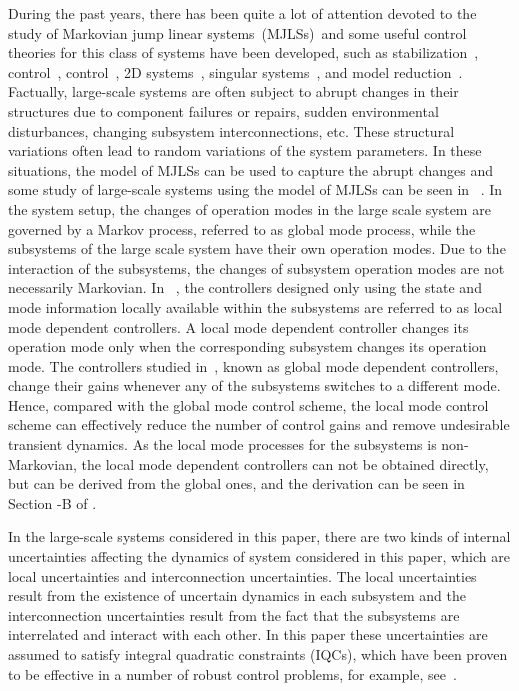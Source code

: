 \documentclass[11pt,draftcls,onecolumn]{IEEEtran}
\begin{document}
 During the past years, there has been quite a lot of attention devoted to the study of  Markovian jump linear systems~(MJLSs)~and some useful control theories for this class of systems have been developed, such as stabilization~\cite{Farias1992,Ma2009,Feng1992},  control~\cite{xiong2009},   control~\cite{Fagoso1993,Li2007,Zhang2009}, 2D systems~\cite{Wu2012H2,Wu2008}, singular systems~\cite{Wu2012L2,Wu2010}, and model reduction~\cite{Zhang2008}. Factually, large-scale systems are often subject to abrupt  changes in their structures due to component failures or repairs, sudden environmental disturbances, changing subsystem interconnections, etc. These structural variations often lead to random variations of the system parameters. In these situations, the model of MJLSs can be used  to capture the abrupt changes and some study of large-scale systems  using the model of MJLSs can be seen in ~\cite{Ugrinovskii2005,Xiong2009,Xiong2010,li2007}.  In the system setup, the changes of operation modes in the large scale system are governed by a
Markov process, referred to as  global mode process, while the subsystems of the large scale system have their own operation modes.
 Due to the interaction of the subsystems, the changes of subsystem operation modes are not necessarily Markovian.  In ~\cite{Xiong2009,Xiong2010}, the controllers  designed only using the state and mode information locally available within the subsystems are referred to as local mode dependent controllers. A local mode dependent controller changes its operation mode only when the corresponding subsystem changes its operation mode. The  controllers studied in~\cite{Ugrinovskii2005,li2007}, known as global mode dependent controllers, change their gains whenever any of the subsystems switches to a different mode.  Hence, compared with the global mode control scheme, the local mode control scheme can effectively reduce the number of control gains  and remove undesirable transient dynamics.   As  the local  mode processes for the subsystems is non-Markovian, the local mode dependent controllers can not be obtained directly, but can be derived from the global ones, and the derivation can be seen in Section \uppercase\expandafter{}-B of \cite{Xiong2009}.

 In the large-scale systems considered in this paper, there are two kinds of internal uncertainties  affecting the dynamics of system considered in this paper, which are local uncertainties and interconnection uncertainties. The local uncertainties  result from the existence of uncertain dynamics in each subsystem and the interconnection uncertainties  result from the fact that the subsystems are interrelated and interact with each other. In this paper these uncertainties are assumed to satisfy integral quadratic constraints (IQCs), which have been proven to be effective in a number of robust control problems, for example, see~\cite{Ugrinovskii2005,Petersen2006,li2007}.
\end{document}
